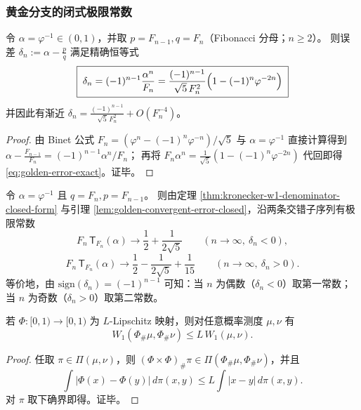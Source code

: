 \subsubsection{黄金分支的闭式极限常数}\label{subsec:kronecker-w1-golden}

\begin{lemma}[黄金分支收敛误差的闭式表达]\label{lem:golden-convergent-error-closed}
令 \(\alpha=\varphi^{-1}\in(0,1)\)，并取 \(p=F_{n-1},q=F_n\)（Fibonacci 分母；\(n\ge 2\)）。
则误差 \(\delta_n:=\alpha-\frac pq\) 满足精确恒等式
\begin{equation}\label{eq:golden-error-exact}
\boxed{\;
\delta_n=(-1)^{n-1}\frac{\alpha^n}{F_n}
=\frac{(-1)^{n-1}}{\sqrt5\,F_n^2}\Bigl(1-(-1)^n\varphi^{-2n}\Bigr)\;}
\end{equation}
并因此有渐近 \(\delta_n=\frac{(-1)^{n-1}}{\sqrt5\,F_n^2}+O(F_n^{-4})\)。
\end{lemma}
\begin{proof}
由 Binet 公式 \(F_n=(\varphi^n-(-1)^n\varphi^{-n})/\sqrt5\) 与 \(\alpha=\varphi^{-1}\) 直接计算得到
\(
\alpha-\frac{F_{n-1}}{F_n}=(-1)^{n-1}\alpha^n/F_n
\)；
再将 \(F_n\alpha^n=\frac{1}{\sqrt5}(1-(-1)^n\varphi^{-2n})\) 代回即得 \eqref{eq:golden-error-exact}。证毕。
\end{proof}

\begin{corollary}\label{cor:kronecker-w1-fibonacci-limits}
令 \(\alpha=\varphi^{-1}\) 且 \(q=F_n,p=F_{n-1}\)。
则由定理 \ref{thm:kronecker-w1-denominator-closed-form} 与引理 \ref{lem:golden-convergent-error-closed}，沿两条交错子序列有极限常数
\[
F_n\,\mathsf{T}_{F_n}(\alpha)\longrightarrow
\frac12+\frac1{2\sqrt5}
\qquad(n\to\infty,\ \delta_n<0),
\]
\[
F_n\,\mathsf{T}_{F_n}(\alpha)\longrightarrow
\frac12-\frac1{2\sqrt5}+\frac1{15}
\qquad(n\to\infty,\ \delta_n>0).
\]
等价地，由 \(\mathrm{sign}(\delta_n)=(-1)^{n-1}\) 可知：当 \(n\) 为偶数（\(\delta_n<0\)）取第一常数；当 \(n\) 为奇数（\(\delta_n>0\)）取第二常数。
\end{corollary}

\begin{proposition}\label{prop:w1-lipschitz-pushforward}
若 \(\Phi:[0,1)\to[0,1)\) 为 \(L\)-Lipschitz 映射，则对任意概率测度 \(\mu,\nu\) 有
\[
W_1(\Phi_\#\mu,\Phi_\#\nu)\le L\,W_1(\mu,\nu).
\]
\end{proposition}
\begin{proof}
任取 \(\pi\in\Pi(\mu,\nu)\)，则 \((\Phi\times\Phi)_\#\pi\in\Pi(\Phi_\#\mu,\Phi_\#\nu)\)，并且
\[
\int|\Phi(x)-\Phi(y)|\,d\pi(x,y)\le L\int|x-y|\,d\pi(x,y).
\]
对 \(\pi\) 取下确界即得。证毕。
\end{proof}

